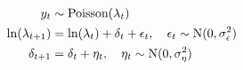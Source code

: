 \documentclass[a4paper,10pt]{article}
\begin{document}
\begin{align*}
 y_t &\sim \textnormal{Poisson}(\lambda_t) \\
 \ln(\lambda_{t+1}) &= \ln(\lambda_t) + \delta_t + \epsilon_t, \quad \epsilon_t \sim \textnormal{N}(0, \sigma_{\epsilon}^2) \\
  \delta_{t+1} &= \delta_t + \eta_t, \quad \eta_t \sim \textnormal{N}(0, \sigma_{\eta}^2)
\end{align*}
\end{document}

